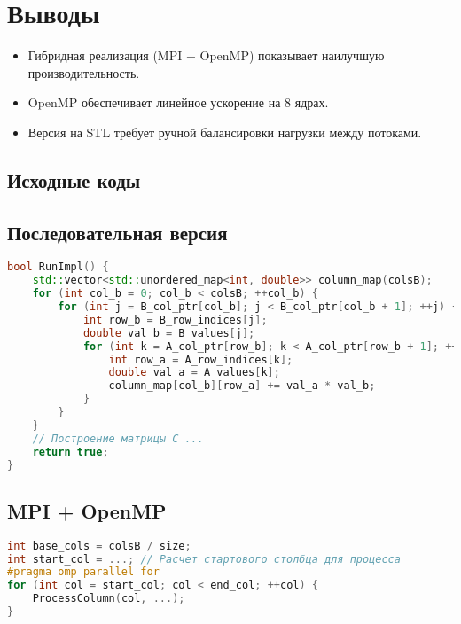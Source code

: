 \documentclass[12pt]{article}
\begin{document}
\section{Выводы}
\begin{itemize}
    \item Гибридная реализация (MPI + OpenMP) показывает наилучшую производительность.
    \item OpenMP обеспечивает линейное ускорение на 8 ядрах.
    \item Версия на STL требует ручной балансировки нагрузки между потоками.
\end{itemize}

\newpage
\begin{appendices}
\section{Исходные коды}
\subsection{Последовательная версия}
\begin{lstlisting}[language=C++, caption=RunImpl из ops\_seq.cpp]
bool RunImpl() {
    std::vector<std::unordered_map<int, double>> column_map(colsB);
    for (int col_b = 0; col_b < colsB; ++col_b) {
        for (int j = B_col_ptr[col_b]; j < B_col_ptr[col_b + 1]; ++j) {
            int row_b = B_row_indices[j];
            double val_b = B_values[j];
            for (int k = A_col_ptr[row_b]; k < A_col_ptr[row_b + 1]; ++k) {
                int row_a = A_row_indices[k];
                double val_a = A_values[k];
                column_map[col_b][row_a] += val_a * val_b;
            }
        }
    }
    // Построение матрицы C ...
    return true;
}
\end{lstlisting}

\subsection{MPI + OpenMP}
\begin{lstlisting}[language=C++, caption=Распределение столбцов в MPI]
int base_cols = colsB / size;
int start_col = ...; // Расчет стартового столбца для процесса
#pragma omp parallel for
for (int col = start_col; col < end_col; ++col) {
    ProcessColumn(col, ...);
}
\end{lstlisting}
\end{appendices}
\end{document}
